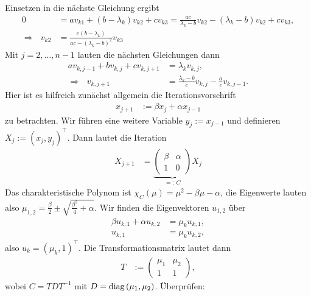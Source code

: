 \documentclass[english, parskip=full]{scrartcl}
\newcommand{\tecxt}{}
\begin{document}
Einsetzen in die nächste Gleichung ergibt
\begin{align}
0 &= av_{k1} + (b-\lambda_k) v_{k2} + cv_{k3} = \frac{ac}{\lambda_k - b} v_{k2} - (\lambda_k - b) v_{k2} + cv_{k3},\\
\Rightarrow\ \ \ v_{k2} &= \frac{c(b-\lambda_k)}{ac - (\lambda_k - b)^2} v_{k3}
\end{align}
Mit $j=2,\dots,n-1$ lauten die nächsten Gleichungen dann
\begin{align}
av_{k,j-1} + bv_{k,j} + cv_{k,j+1} &= \lambda_k v_{k,j},\\
\Rightarrow\ \ \ v_{k,j+1} &= \frac{\lambda_k - b}{c} v_{k,j} - \frac{a}{c} v_{k,j-1}.
\end{align}
Hier ist es hilfreich zunächst allgemein die Iterationsvorschrift
\begin{align}
x_{j+1} &:= \beta x_j + \alpha x_{j-1}
\end{align}
zu betrachten.
Wir führen eine weitere Variable $y_{j} := x_{j-1}$ und definieren $X_j := (x_j,y_j)^\top$.
Dann lautet die Iteration
\begin{align}
X_{j+1} &= \underbrace{\begin{pmatrix}
\beta & \alpha \\ 1 & 0
\end{pmatrix}}_{=:\,C}  X_j
\end{align}
Das charakteristische Polynom ist $\chi_C(\mu) = \mu^2 - \beta\mu - \alpha$, die Eigenwerte lauten also $\mu_{1,2} = \frac{\beta}{2} \pm \sqrt{\frac{\beta^2}{4} + \alpha}$.
Wir finden die Eigenvektoren $u_{1,2}$ über
\begin{align}
\beta u_{k,1} + \alpha u_{k,2} &= \mu_k u_{k,1},\\
u_{k,1} &= \mu_k u_{k,2},
\end{align}
also $u_{k} = (\mu_k,1)^\top$.
Die Transformationsmatrix lautet dann
\begin{align}
T &:= \begin{pmatrix}
\mu_1 & \mu_2 \\ 1 & 1
\end{pmatrix},
\end{align}
wobei $C = TDT^{-1}$ mit $D=\tecxt\text{diag\,}(\mu_1,\mu_2)$.
Überprüfen:
\end{document}
